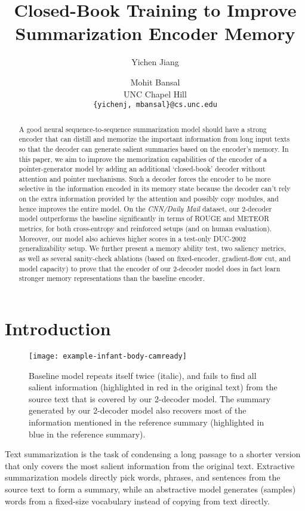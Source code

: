 \documentclass[11pt,a4paper]{article}
\title{Closed-Book Training to Improve Summarization Encoder Memory}
\author{Yichen Jiang \and Mohit Bansal \\
  UNC Chapel Hill \\
  {\tt \{yichenj, mbansal\}@cs.unc.edu} \\
 }
\date{}
\begin{document}
\maketitle

\begin{abstract}

A good neural sequence-to-sequence summarization model should have a strong encoder that can distill and memorize the important information from long input texts so that the decoder can generate salient summaries based on the encoder's memory. In this paper, we aim to improve the memorization capabilities of the encoder of a pointer-generator model by adding an additional `closed-book' decoder without attention and pointer mechanisms. Such a decoder forces the encoder to be more selective in the information encoded in its memory state because the decoder can't rely on the extra information provided by the attention and possibly copy modules, and hence improves the entire model. 
On the \emph{CNN/Daily Mail} dataset, our 2-decoder model outperforms the baseline significantly in terms of ROUGE and METEOR metrics, for both cross-entropy and reinforced setups (and on human evaluation). 
Moreover, our model also achieves higher scores in a test-only DUC-2002 generalizability setup.
We further present a memory ability test, two saliency metrics, as well as several sanity-check ablations (based on fixed-encoder, gradient-flow cut, and model capacity) to prove that the encoder of our 2-decoder model does in fact learn stronger memory representations than the baseline encoder.
\end{abstract} \section{Introduction}
 
\begin{figure}[t]
\centering
\texttt{[image: example-infant-body-camready]}
\vspace{-6pt} 
\caption{Baseline model repeats itself twice (italic), and fails to find all salient information (highlighted in red in the original text) from the source text that is covered by our 2-decoder model.
The summary generated by our 2-decoder model also recovers most of the information mentioned in the reference summary (highlighted in blue in the reference summary).\label{fig:example-infant-body-small} }
\end{figure}

Text summarization is the task of condensing a long passage to a shorter version that only covers the most salient information from the original text. Extractive summarization models \cite{Jing:00,Knight:02,Clarke:08,Filippova:15} directly pick words, phrases, and sentences from the source text to form a summary, while an abstractive model generates (samples) words from a fixed-size vocabulary instead of copying from text directly. 
\end{document}
